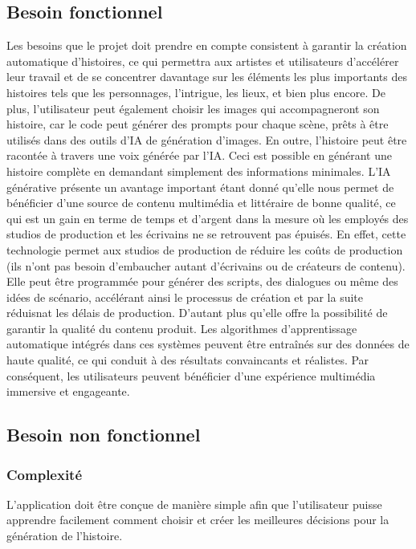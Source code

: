 \documentclass[11,5pt]{report}
\begin{document}
\begin{spacing}{2}
\subsection{Besoin fonctionnel}
Les besoins que le projet doit prendre en compte consistent à garantir la création automatique d'histoires, ce qui permettra aux artistes  et utilisateurs d'accélérer leur travail et de se concentrer davantage sur les éléments les plus importants des histoires tels que les personnages, l'intrigue, les lieux, et bien plus encore. De plus, l'utilisateur peut également choisir les images qui accompagneront son histoire, car le code peut générer des prompts pour chaque scène, prêts à être utilisés dans des outils d'IA de génération d'images. En outre, l'histoire peut être racontée à travers une voix générée par l'IA.
\newline
Ceci est possible en générant une histoire complète en demandant simplement des informations minimales.
\newline
L'IA générative présente un avantage important étant donné qu'elle nous permet de bénéficier d'une source de contenu multimédia et littéraire de bonne qualité, ce qui est un gain en terme de temps et d'argent dans la mesure où les employés des studios de production et les écrivains ne se retrouvent pas épuisés.
En effet, cette technologie permet aux studios de production de réduire les coûts de production (ils n'ont pas besoin d'embaucher autant d'écrivains ou de créateurs de contenu). Elle peut être programmée pour générer des scripts, des dialogues ou même des idées de scénario, accélérant ainsi le processus de création et par la suite réduisnat les délais de production.
D'autant plus qu'elle offre la possibilité de garantir la qualité du contenu produit. Les algorithmes d'apprentissage automatique intégrés dans ces systèmes peuvent être entraînés sur des données de haute qualité, ce qui conduit à des résultats convaincants et réalistes. Par conséquent, les utilisateurs peuvent bénéficier d'une expérience multimédia immersive et engageante.

\subsection{Besoin non fonctionnel}
\subsubsection{Complexité }L'application doit être conçue de manière simple afin que l'utilisateur puisse apprendre facilement comment choisir et créer les meilleures décisions pour la génération de l'histoire.

\end{spacing}
\end{document}
